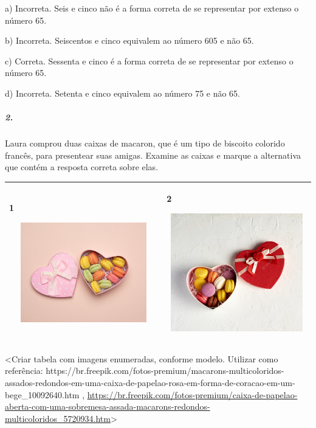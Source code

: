 a) Incorreta. Seis e cinco não é a forma correta de se representar por
extenso o número 65.

b) Incorreta. Seiscentos e cinco equivalem ao número 605 e não 65.

c) Correta. Sessenta e cinco é a forma correta de se representar por
extenso o número 65.

d) Incorreta. Setenta e cinco equivalem ao número 75 e não 65.

\subparagraph{2. }\label{section-146}

Laura comprou duas caixas de macaron, que é um tipo de biscoito colorido
francês, para presentear suas amigas. Examine as caixas e marque a
alternativa que contém a resposta correta sobre elas.

\begin{longtable}[]{@{}ll@{}}
\toprule
\begin{minipage}[t]{0.48\columnwidth}\raggedright\strut
1

\includegraphics[width=2.97774in,height=1.70540in]{media/image163.png}\strut
\end{minipage} & \begin{minipage}[t]{0.48\columnwidth}\raggedright\strut
2

\includegraphics[width=2.80101in,height=2.01728in]{media/image164.png}\strut
\end{minipage}\tabularnewline
\bottomrule
\end{longtable}

\textless{}Criar tabela com imagens enumeradas, conforme modelo.
Utilizar como referência:
https://br.freepik.com/fotos-premium/macarons-multicoloridos-assados-redondos-em-uma-caixa-de-papelao-rosa-em-forma-de-coracao-em-um-bege\_10092640.htm
,
\url{https://br.freepik.com/fotos-premium/caixa-de-papelao-aberta-com-uma-sobremesa-assada-macarons-redondos-multicoloridos_5720934.htm}\textgreater{}

